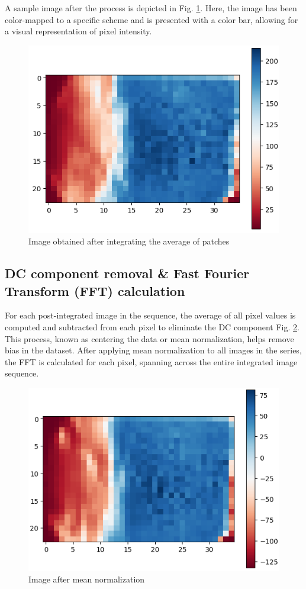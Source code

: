 \documentclass[conference]{IEEEtran}
\begin{document}
A sample image after the process is depicted in Fig. \ref{fig:k3}. Here, the image has been color-mapped to a specific scheme and is presented with a color bar, allowing for a visual representation of pixel intensity.
	
		\begin{figure}[H]
		\includegraphics[scale=.51]{plot/pool.png}
		\caption{Image obtained after integrating the average of patches}\label{fig:k3}
	\end{figure}
	
\subsection{DC component removal \& Fast Fourier Transform (FFT) calculation}


For each post-integrated image in the sequence, the average of all pixel values is computed and subtracted from each pixel to eliminate the DC component Fig. \ref{fig:k4}. This process, known as centering the data or mean normalization, helps remove bias in the dataset. After applying mean normalization to all images in the series, the FFT is calculated for each pixel, spanning across the entire integrated image sequence.

		\begin{figure}[H]
	\includegraphics[scale=.51]{plot/pool2.png}
	\caption{Image after mean normalization}\label{fig:k4}
\end{figure}
\end{document}

